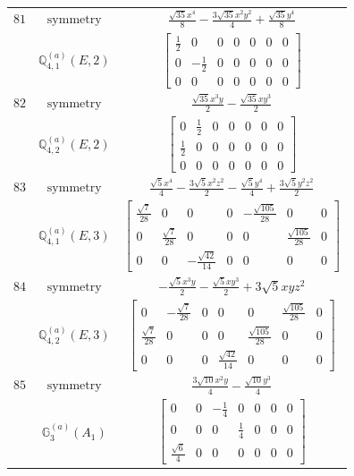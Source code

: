 \documentclass[fleqn,8pt,landscape]{jsarticle}
\begin{document}
\begin{longtable}{ccc}
$ 81 $ & $ \text{symmetry} $ & $ \frac{\sqrt{35} x^{4}}{8} - \frac{3 \sqrt{35} x^{2} y^{2}}{4} + \frac{\sqrt{35} y^{4}}{8} $ \\
$  $ & $ \mathbb{Q}_{4,1}^{(a)}(E,2) $ & $ \begin{bmatrix} \frac{1}{2} & 0 & 0 & 0 & 0 & 0 & 0 \\ 0 & - \frac{1}{2} & 0 & 0 & 0 & 0 & 0 \\ 0 & 0 & 0 & 0 & 0 & 0 & 0 \end{bmatrix} $ \\ \hline
$ 82 $ & $ \text{symmetry} $ & $ \frac{\sqrt{35} x^{3} y}{2} - \frac{\sqrt{35} x y^{3}}{2} $ \\
$  $ & $ \mathbb{Q}_{4,2}^{(a)}(E,2) $ & $ \begin{bmatrix} 0 & \frac{1}{2} & 0 & 0 & 0 & 0 & 0 \\ \frac{1}{2} & 0 & 0 & 0 & 0 & 0 & 0 \\ 0 & 0 & 0 & 0 & 0 & 0 & 0 \end{bmatrix} $ \\ \hline
$ 83 $ & $ \text{symmetry} $ & $ \frac{\sqrt{5} x^{4}}{4} - \frac{3 \sqrt{5} x^{2} z^{2}}{2} - \frac{\sqrt{5} y^{4}}{4} + \frac{3 \sqrt{5} y^{2} z^{2}}{2} $ \\
$  $ & $ \mathbb{Q}_{4,1}^{(a)}(E,3) $ & $ \begin{bmatrix} \frac{\sqrt{7}}{28} & 0 & 0 & 0 & - \frac{\sqrt{105}}{28} & 0 & 0 \\ 0 & \frac{\sqrt{7}}{28} & 0 & 0 & 0 & \frac{\sqrt{105}}{28} & 0 \\ 0 & 0 & - \frac{\sqrt{42}}{14} & 0 & 0 & 0 & 0 \end{bmatrix} $ \\ \hline
$ 84 $ & $ \text{symmetry} $ & $ - \frac{\sqrt{5} x^{3} y}{2} - \frac{\sqrt{5} x y^{3}}{2} + 3 \sqrt{5} x y z^{2} $ \\
$  $ & $ \mathbb{Q}_{4,2}^{(a)}(E,3) $ & $ \begin{bmatrix} 0 & - \frac{\sqrt{7}}{28} & 0 & 0 & 0 & \frac{\sqrt{105}}{28} & 0 \\ \frac{\sqrt{7}}{28} & 0 & 0 & 0 & \frac{\sqrt{105}}{28} & 0 & 0 \\ 0 & 0 & 0 & \frac{\sqrt{42}}{14} & 0 & 0 & 0 \end{bmatrix} $ \\ \hline
$ 85 $ & $ \text{symmetry} $ & $ \frac{3 \sqrt{10} x^{2} y}{4} - \frac{\sqrt{10} y^{3}}{4} $ \\
$  $ & $ \mathbb{G}_{3}^{(a)}(A_{1}) $ & $ \begin{bmatrix} 0 & 0 & - \frac{1}{4} & 0 & 0 & 0 & 0 \\ 0 & 0 & 0 & \frac{1}{4} & 0 & 0 & 0 \\ \frac{\sqrt{6}}{4} & 0 & 0 & 0 & 0 & 0 & 0 \end{bmatrix} $ \\ \hline

\end{longtable}
\end{document}
